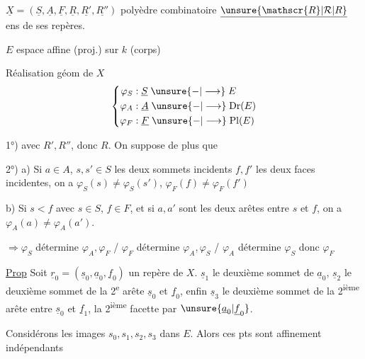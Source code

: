$\underline{X}=(\underline{S},\underline{A},\underline{F},\underline{R},\underline{R'},\underline{R''})$ polyèdre combinatoire $\underline{\unsure{\mathscr{R}|\mathcal{R}|R}}$ ens de ses repères.

$E$ espace affine (proj.) sur $k$ (corps)

Réalisation géom de $X$
\[
\left\{\begin{aligned}
\varphi_S &: \underline{S}\mathrel{\unsure{-|\longrightarrow}}E\\
\varphi_A &: \underline{A}\mathrel{\unsure{-|\longrightarrow}}\mathrm{Dr}(E)\\
\varphi_F &: \underline{F}\mathrel{\unsure{-|\longrightarrow}}\mathrm{Pl}(E)
\end{aligned}\right.
\]

1°)  avec $R',R''$, donc $R$. On suppose de plus que

2°) a) Si $a\in A$, $s,s'\in S$ les deux sommets incidents $f,f'$ les deux faces incidentes, on a $\varphi_S(s)\ne\varphi_S(s')$, $\varphi_F(f)\ne\varphi_F(f')$

b) Si $s<f$ avec $s\in S$, $f\in F$, et si $a,a'$ sont les deux arêtes entre $s$ et $f$, on a $\varphi_A(a)\ne\varphi_A(a')$.

$\Rightarrow\varphi_S$ détermine $\varphi_A,\varphi_F$ /  $\varphi_F$ détermine $\varphi_A,\varphi_S$ / $\varphi_A$ détermine $\varphi_S$ donc $\varphi_F$


\uline{Prop} Soit $\underline{r}_0=(\underline{s}_0,\underline{a}_0,\underline{f}_0)$ un repère de $X$.  $\underline{s}_1$ le deuxième sommet de $\underline{a}_0$, $\underline{s}_2$ le deuxième sommet de la 2\textsuperscript{e} arête   $\underline{s}_0$ et $\underline{f}_0$, enfin $\underline{s}_3$ le deuxième sommet de la 2\textsuperscript{ième} arête  entre $\underline{s}_0$ et $\underline{f}_1$, la 2\textsuperscript{ième} facette  par $\unsure{\underline{a}_0|\underline{f}_0}$.

Considérons les images $s_0,s_1,s_2,s_3$ dans $E$. Alors ces pts sont affinement indépendants
